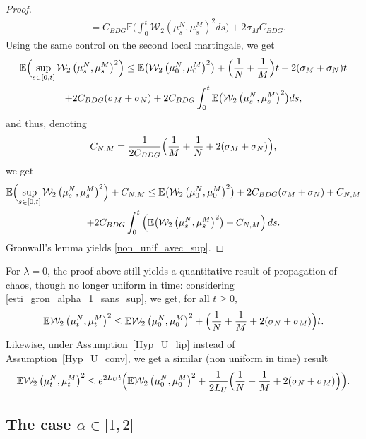 \begin{proof}
\begin{align*}
&=C_{BDG}\mathbb{E}\biggl(\int_0^t\mathcal{W}_2\left(\mu_s^N,\mu_s^M\right)^2ds\biggr)+2\sigma_MC_{BDG}.
\end{align*}
Using the same control on the second local martingale, we get
\begin{multline*}
\mathbb{E}\Bigl(\sup_{s\in[0,t]}\mathcal{W}_2\left(\mu_s^N,\mu_s^M\right)^2\Bigr)\leq\mathbb{E}\bigl(\mathcal{W}_2\left(\mu_0^N,\mu_0^M\right)^2\bigr)+\Bigl(\frac{1}{N}+\frac{1}{M}\Bigr)t+2(\sigma_M+\sigma_N)t\\
+2C_{BDG}(\sigma_M+\sigma_N)+2C_{BDG}\int_0^t\mathbb{E}\bigl(\mathcal{W}_2\left(\mu_s^N,\mu_s^M\right)^2\bigr)ds,
\end{multline*}
and thus, denoting
\[
C_{N,M}=\frac{1}{2C_{BDG}}\Bigl(\frac{1}{M}+\frac{1}{N}+2(\sigma_M+\sigma_N)\Bigr),
\]
we get
\begin{multline*}
\mathbb{E}\Bigl(\sup_{s\in[0,t]}\mathcal{W}_2\left(\mu_s^N,\mu_s^M\right)^2\Bigr)+C_{N,M}\leq \mathbb{E}\bigl(\mathcal{W}_2\left(\mu_0^N,\mu_0^M\right)^2\bigr)+2C_{BDG}(\sigma_M+\sigma_N)+C_{N,M}\\
+2C_{BDG}\int_0^t\left(\mathbb{E}\bigl(\mathcal{W}_2\left(\mu_s^N,\mu_s^M\right)^2\bigr)+C_{N,M}\right)ds.
\end{multline*}
Gronwall's lemma yields \eqref{non_unif_avec_sup}.
\end{proof}

\begin{remark}
For $\lambda=0$, the proof above still yields a quantitative result of propagation of chaos, though no longer uniform in time: considering \eqref{esti_gron_alpha_1_sans_sup}, we get, for all $t\geq0$,
\begin{equation*}
\mathbb{E}\mathcal{W}_2\left(\mu_t^N,\mu_t^M\right)^2\leq\mathbb{E}\mathcal{W}_2\left(\mu_0^N,\mu_0^M\right)^2+\Bigl(\frac{1}{N}+\frac{1}{M}+2(\sigma_N+\sigma_M)\Bigr)t.
\end{equation*}
Likewise, under Assumption~\ref{Hyp_U_lip} instead of Assumption~\ref{Hyp_U_conv}, we get a similar (non uniform in time) result
\[
\mathbb{E}\mathcal{W}_2\left(\mu_t^N,\mu_t^M\right)^2\leq e^{2L_Ut}\Bigl(\mathbb{E}\mathcal{W}_2\left(\mu_0^N,\mu_0^M\right)^2+\frac{1}{2L_U}\Bigl(\frac{1}{N}+\frac{1}{M}+2(\sigma_N+\sigma_M)\Bigr)\Bigr).
\]
\end{remark}

\subsection{The case $\alpha\in{}]1,2[$}\label{sec_prop_alpha_sup_1}

